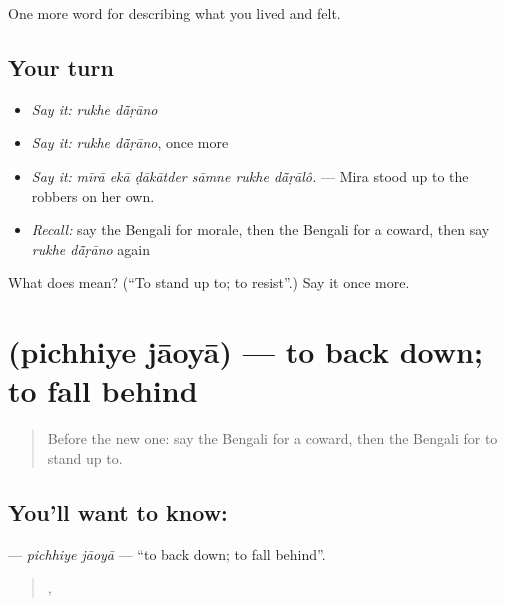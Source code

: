 \begin{grammarlens}[title={What you've built}]
One more word for describing what you lived and felt.
\end{grammarlens}

\subsection*{Your turn}
\begin{itemize}
\raggedright
  \item \emph{Say it:} \emph{rukhe dā̃ṛāno}
  \item \emph{Say it:} \emph{rukhe dā̃ṛāno}, once more
  \item \emph{Say it:} \emph{mīrā ekā ḍākātder sāmne rukhe dā̃ṛālô.} — Mira stood up to the robbers on her own.
  \item \emph{Recall:} say the Bengali for morale, then the Bengali for a coward, then say \emph{rukhe dā̃ṛāno} again
\end{itemize}

\begin{tcolorbox}[breakable,colback=teal!4,colframe=teal!35!black,title={Before you move on}]
What does   mean? (\textquotedblleft{}To stand up to; to resist\textquotedblright{}.) Say it once more.
\end{tcolorbox}
\section[\texorpdfstring{\bn{পিছিয়ে} \bn{যাওয়া} (pichhiye jāoyā)}{পিছিয়ে যাওয়া (pichhiye jāoyā)}]{  (pichhiye jāoyā) — to back down; to fall behind}

\label{lesson:BN-C453-pichhiye-jaoya}



\begin{quote}
Before the new one: say the Bengali for a coward, then the Bengali for to stand up to.
\end{quote}

\subsection*{You'll want to know:  }
\textbf{ } — \emph{pichhiye jāoyā} — \textquotedblleft{}to back down; to fall behind\textquotedblright{}.

\begin{quote}
  ,    
\end{quote}

